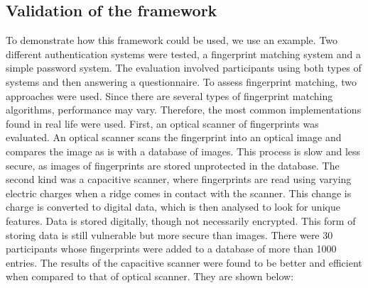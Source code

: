 \subsection{Validation of the framework}
To demonstrate how this framework could be used, we use an example. Two different authentication systems were tested, a fingerprint matching system and a simple password system. The evaluation involved participants using both types of systems and then answering a questionnaire. To assess fingerprint matching, two approaches were used. Since there are several types of fingerprint matching algorithms, performance may vary. Therefore, the most common implementations found in real life were used. First, an optical scanner of fingerprints was evaluated. An optical scanner scans the fingerprint into an optical image and compares the image as is with a database of images. This process is slow and less secure, as images of fingerprints are stored unprotected in the database. The second kind was a capacitive scanner, where fingerprints are read using varying electric charges when a ridge comes in contact with the scanner. This change is charge is converted to digital data, which is then analysed to look for unique features. Data is stored digitally, though not necessarily encrypted. This form of storing data is still vulnerable but more secure than images. There were 30 participants whose fingerprints were added to a database of more than 1000 entries. The results of the capacitive scanner were found to be better and efficient when compared to that of optical scanner. They are shown below:

\begin{center}
\begin{table}[H]
\caption{Results for fingerprint recognition using capacitive scanner.}
\label{tab:result1}
\end{table}
\end{center}

